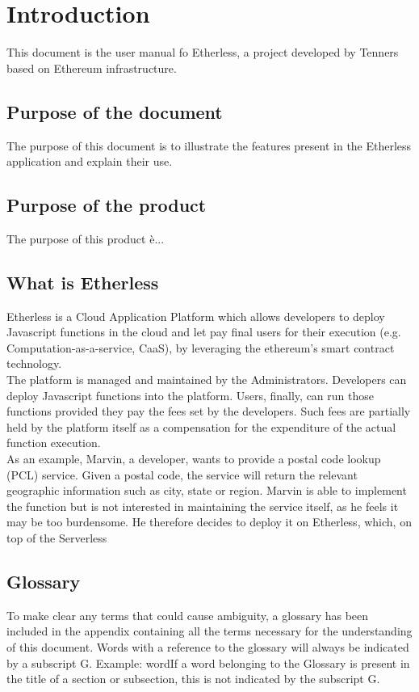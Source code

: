 \section{Introduction}
This document is the user manual fo Etherless, a project developed by Tenners based on Ethereum infrastructure.

\subsection{Purpose of the document}
The purpose of this document is to illustrate the features present in the Etherless application and explain their use.

\subsection{Purpose of the product}
The purpose of this product è...
\subsection{What is Etherless}
Etherless is a Cloud Application Platform which allows developers to deploy Javascript functions in the cloud and let pay final users for their execution (e.g. Computation-as-a-service, CaaS), by leveraging the ethereum's smart contract technology.\\
The platform is managed and maintained by the Administrators. 
Developers can deploy Javascript functions into the platform. Users, finally, can run those functions provided they pay the fees set by the developers. Such fees are partially held by the platform itself as a compensation for the expenditure of the actual function execution.\\
As an example, Marvin, a developer, wants to provide a postal code lookup (PCL) service. Given a postal 
code, the service will return the relevant geographic information such as city, state or region. Marvin is able 
to implement the function but is not interested in maintaining the service itself, as he feels it may be too 
burdensome. He therefore decides to deploy it on Etherless, which, on top of the Serverless

\subsection{Glossary}
To make clear any terms that could cause ambiguity, a glossary has been included in the appendix containing all the terms necessary for the understanding of this document. Words with a reference to the glossary will always be indicated by a subscript G. Example: word\glo If a word belonging to the Glossary is present in the title of a section or subsection, this is not indicated by the subscript G.
